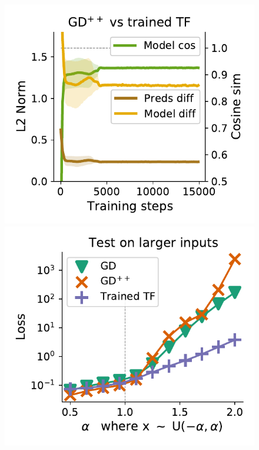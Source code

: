 \documentclass{article}
\theoremstyle{plain}
\theoremstyle{definition}
\theoremstyle{remark}
\begin{document}
\begin{figure}
\begin{center}
\begin{minipage}{.24\textwidth}
\begin{center}
  \end{center}
  \vspace{-10pt}
\end{minipage}
\begin{minipage}{.24\textwidth}
  \centering
  \begin{center}
    \includegraphics[width=1.\textwidth]{Final_figures/LayerNorm/sim_9.pdf}
  \end{center}
  \vspace{-10pt}
\end{minipage}
\begin{minipage}{.24\textwidth}
  \centering
  \begin{center}
    \includegraphics[width=1.\textwidth]{Final_figures/LayerNorm/normal_23.pdf}

\end{center}
\end{minipage}
\end{center}
\end{figure}
\end{document}
